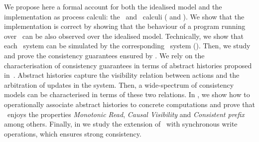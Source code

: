 We propose here a
formal account for both the idealised model and the  implementation as process calculi: the 
\gsp\ and \igsp\ calculi ( and ). We show
that the implementation is correct by showing that the behaviour of a program
running over \igsp\ can be also observed over the idealised model. Technically, 
we show that each \igsp\ system can be simulated by the corresponding 
\gsp\  system (). Then, we study and prove the consistency guarantees ensured by 
\gsp.  
We rely on the characterisation of consistency guarantees in terms of abstract histories proposed in~\cite{DBLP:journals/ftpl/Burckhardt14}.
Abstract histories capture the visibility relation between actions and the arbitration of updates in the system. Then, 
a wide-spectrum of consistency models can be characterised in terms of these two relations. 
In , 
we show how to operationally associate abstract histories to concrete computations and 
prove that \gsp\ enjoys the properties  \textit{Monotonic Read},
 \textit{Causal Visibility}
and	{\em Consistent prefix} among others. Finally, in  we study the  
extension of \gsp\ with synchronous write operations, which ensures strong consistency. 


